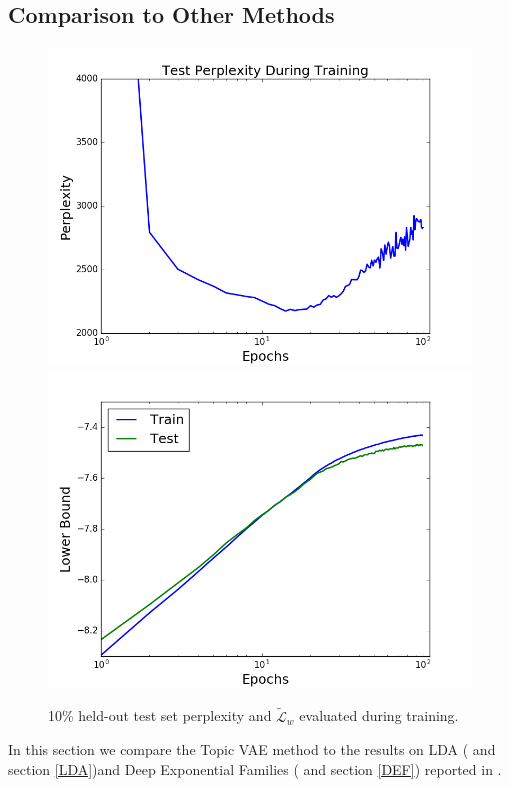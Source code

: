 \documentclass{report}
\begin{document}
	\subsection{Comparison to Other Methods}\label{comp_other}
	\begin{figure}
		\includegraphics[scale=0.45]{img/10pcperplex.png}
		\includegraphics[scale=0.45]{img/lbcompdef.png}
		\caption{10\% held-out test set perplexity and $\tilde{\mathcal{L}}_w$ evaluated during training.}
		\label{10pctoverfit}
	\end{figure}	
	In this section we compare the Topic VAE method to the results on LDA (\cite{blei2003latent} and section \ref{LDA})and Deep Exponential Families (\cite{ranganath2015deep} and section \ref{DEF}) reported in \cite{ranganath2015deep}. 
\end{document}
